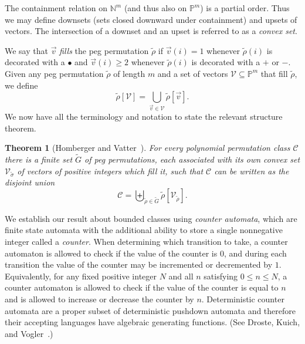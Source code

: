 \documentclass[10pt]{article}
\theoremstyle{plain}
\newtheorem{theorem}{Theorem}[section]
\theoremstyle{definition}
\newcommand{\C}{\mathcal{C}}
\newcommand{\p}[1]{#1^+}
\newcommand{\m}[1]{#1^-}
\renewcommand{\d}[1]{#1^{\bullet}}
\begin{document}
The containment relation on $\mathbb{N}^m$ (and thus also on $\mathbb{P}^m$) is  a partial order. Thus we may define downsets (sets closed downward under containment) and upsets of vectors. The intersection of a downset and an upset is referred to as a \emph{convex set}.

We say that $\vec{v}$ \emph{fills} the peg permutation $\tilde{\rho}$ if $\vec{v}(i) = 1$ whenever $\tilde{\rho}(i)$ is decorated with a $\bullet$ and $\vec{v}(i) \geq 2$ whenever $\tilde{\rho}(i)$ is decorated with a $+$ or $-$.
Given any peg permutation $\tilde{\rho}$ of length $m$ and a set of vectors $\mathcal{V}\subseteq\mathbb{P}^m$ that fill $\tilde{\rho}$, we define
\[
	\tilde{\rho}[\mathcal{V}]=\bigcup_{\vec{v}\in\mathcal{V}} \tilde{\rho}[\vec{v}].
\]
We now have all the terminology and notation to state the relevant structure theorem.

\begin{theorem}[Homberger and Vatter~\cite{homberger:on-the-effectiv:}]
\label{thm-polynomial-main}
For every polynomial permutation class $\C$ there is a finite set $\tilde{G}$ of peg permutations, each associated with its own convex set $\mathcal{V}_{\tilde{\sigma}}$ of vectors of positive integers which fill it, such that $\C$ can be written as the disjoint union
\[
	\C=\biguplus_{\tilde{\rho}\in\tilde{G}} \tilde{\rho}[\mathcal{V}_{\tilde{\rho}}].
\]	
\end{theorem}

We establish our result about bounded classes using \emph{counter automata}, which are finite state automata with the additional ability to store a single nonnegative integer called a \emph{counter}. When determining which transition to take, a counter automaton is allowed to check if the value of the counter is $0$, and during each transition the value of the counter may be incremented or decremented by $1$. Equivalently, for any fixed positive integer $N$ and all $n$ satisfying $0\le n\le N$, a counter automaton is allowed to check if the value of the counter is equal to $n$ and is allowed to increase or decrease the counter by $n$. Deterministic counter automata are a proper subset of deterministic pushdown automata and therefore their accepting languages have algebraic generating functions. (See Droste, Kuich, and Vogler~\cite[Chapter 7]{:Handbook-of-wei:}.)
\end{document}
